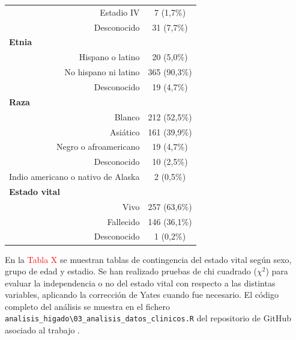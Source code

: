 \begin{table}[H]
\begin{tabular}{rc}
		Estadio IV                                     & 7 (1,7\%)                                        \\
		Desconocido                                    & 31 (7,7\%)                                       \\ \hline
		\multicolumn{1}{l}{\textbf{Etnia}}             &                                                  \\
		Hispano o latino                               & 20 (5,0\%)                                         \\
		No hispano ni latino                           & 365 (90,3\%)                                     \\
		Desconocido                                    & 19 (4,7\%)                                       \\ \hline
		\multicolumn{1}{l}{\textbf{Raza}}              &                                                  \\
		Blanco                                         & 212 (52,5\%)                                     \\
		Asiático                                       & 161 (39,9\%)                                     \\
		Negro o afroamericano                          & 19 (4,7\%)                                       \\
		Desconocido                                    & 10 (2,5\%)                                       \\
		Indio americano o nativo de Alaska             & 2 (0,5\%)                                        \\ \hline
		\multicolumn{1}{l}{\textbf{Estado vital}}      &                                                  \\ 
		Vivo                                           & 257 (63,6\%)                                     \\
		Fallecido                                         & 146 (36,1\%)                                     \\
		Desconocido                                    & 1 (0,2\%)                                        \\ \hline
	\end{tabular}
\end{table}

En la \textcolor{red}{Tabla X} se muestran tablas de contingencia del estado vital según sexo, grupo de edad y estadio. Se han realizado pruebas de chi cuadrado ($\chi^2$) \cite{Pearson1900} para evaluar la independencia o no del estado vital con respecto a las distintas variables, aplicando la corrección de Yates \cite{Yates1934} cuando fue necesario. El código completo del análisis se muestra en el fichero \texttt{analisis\_higado\textbackslash03\_analisis\_datos\_clinicos.R} del repositorio de GitHub asociado al trabajo \cite{Redondo-Sanchez2020}.\\

